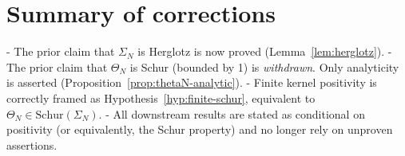 \documentclass[11pt]{article}
\newcommand{\SiN}{\Sigma_N}
\newcommand{\ThN}{\Theta_N}
\theoremstyle{plain}
\theoremstyle{definition}
\theoremstyle{remark}
\begin{document}
\section{Summary of corrections}
- The prior claim that $\SiN$ is Herglotz is now proved (Lemma~\ref{lem:herglotz}).
- The prior claim that $\ThN$ is Schur (bounded by 1) is \emph{withdrawn}. Only analyticity is asserted (Proposition~\ref{prop:thetaN-analytic}).
- Finite kernel positivity is correctly framed as Hypothesis~\ref{hyp:finite-schur}, equivalent to $\ThN\in \mathrm{Schur}(\SiN)$.
- All downstream results are stated as conditional on positivity (or equivalently, the Schur property) and no longer rely on unproven assertions.
\end{document}
